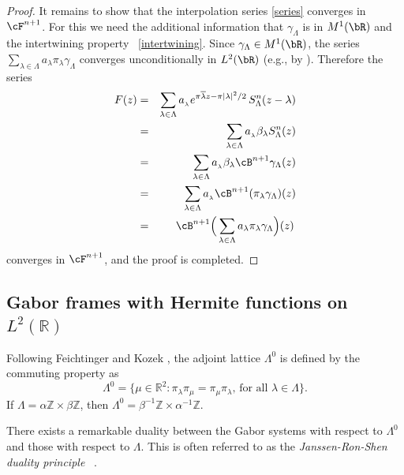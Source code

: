 \documentclass[12pt]{amsart}
\theoremstyle{plain}
\numberwithin{equation}{section}
\begin{document}
\begin{proof}
It remains to show that the interpolation series \eqref{series} converges in 
$\cF ^{n+1}$. For this we need the additional information that $\gamma
_\Lambda $ is in $M^1(\bR )$ and the intertwining property~%
\eqref{intertwining}. Since $\gamma _\Lambda \in M^1(\bR )$, the series $%
\sum _{\lambda \in \Lambda } a_\lambda \pi _\lambda \gamma _\Lambda $
converges unconditionally in $L^2(\bR)$ (e.g., by \cite[Thm.~12.2.4]{Charly}%
). Therefore the series 
\begin{eqnarray*}
F(z)&=&\sum_{\lambda \in \Lambda }a_{_{\lambda }}e^{\pi \overline{\lambda }%
z-\pi \left\vert \lambda \right\vert ^{2}/2} \, S^n_{\Lambda }(z-\lambda ) \\
&=& \sum_{\lambda \in \Lambda }a_{_{\lambda }} \beta _\lambda S_\Lambda ^n
(z) \\
&=& \sum_{\lambda \in \Lambda }a_{_{\lambda }} \beta _\lambda \cB ^{n+1}
\gamma _\Lambda (z) \\
&=& \sum_{\lambda \in \Lambda }a_{_{\lambda }} \cB ^{n+1} (\pi _\lambda
\gamma _\Lambda ) (z) \\
&=& \cB ^{n+1} \Big(\sum_{\lambda \in \Lambda }a_{\lambda } \pi _\lambda
\gamma _\Lambda \Big) (z) \,
\end{eqnarray*}
converges in $\cF ^{n+1}$, and the proof is completed.
\end{proof}

\subsection{Gabor frames with Hermite functions on $L^{2}(%
\mathbb{R}
)$}

Following Feichtinger and Kozek \cite{FK}, the adjoint lattice $\Lambda ^{0}$
is defined by the commuting property as%
\begin{equation*}
\Lambda ^{0}=\{\mu \in 
\mathbb{R}
^{2}:\pi _{\lambda }\pi _{\mu }=\pi _{\mu }\pi _{\lambda }\text{, for all }%
\lambda \in \Lambda \}\text{.}
\end{equation*}%
If $\Lambda =\alpha 
\mathbb{Z}
\times \beta 
\mathbb{Z}
$, then $\Lambda ^{0}=\beta ^{-1}%
\mathbb{Z}
\times \alpha ^{-1}%
\mathbb{Z}
$.

There exists a remarkable duality between the Gabor systems with respect to $%
\Lambda ^{0}$ and those with respect to $\Lambda $. This is often referred
to as the \emph{Janssen-Ron-Shen duality principle }~\cite%
{JanssenDuality,RonShen}.
\end{document}
